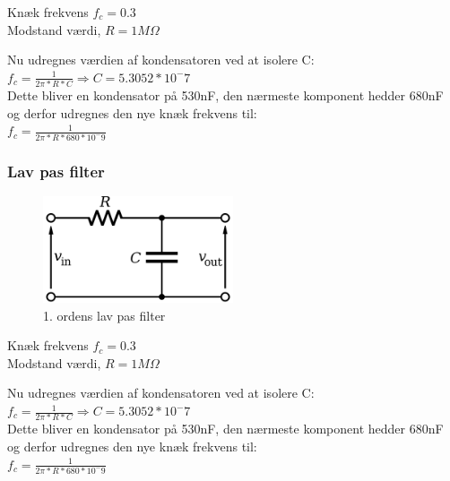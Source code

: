 Knæk frekvens $f_c = 0.3$ \\
Modstand værdi, $R = 1M\Omega$

Nu udregnes værdien af kondensatoren ved at isolere C: \\
$f_c = \frac{1}{2\pi * R * C} \Rightarrow C = 5.3052 * 10^-7$ \\

Dette bliver en kondensator på 530nF, den nærmeste komponent hedder 680nF og derfor udregnes den nye knæk frekvens til:  \\
$ f_c = \frac{1}{2\pi * R * 680 * 10^-9} $


\subsubsection{Lav pas filter}
\begin{figure}[H]
	\centering
	\includegraphics[width = 0.5\textwidth]{billeder/LowPass.png}
	\caption{1. ordens lav pas filter}\label{fig:lowpass}
\end{figure}
Knæk frekvens $f_c = 0.3$ \\
Modstand værdi, $R = 1M\Omega$

Nu udregnes værdien af kondensatoren ved at isolere C: \\
$f_c = \frac{1}{2\pi * R * C} \Rightarrow C = 5.3052 * 10^-7$ \\

Dette bliver en kondensator på 530nF, den nærmeste komponent hedder 680nF og derfor udregnes den nye knæk frekvens til:  \\
$ f_c = \frac{1}{2\pi * R * 680 * 10^-9} $

\newpage
